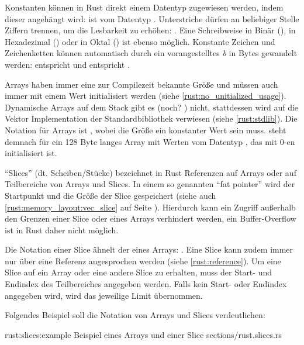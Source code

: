 Konstanten können in Rust direkt einem Datentyp zugewiesen werden, indem dieser angehängt wird:  ist vom Datentyp .
Unterstriche dürfen an beliebiger Stelle Ziffern trennen, um die Lesbarkeit zu erhöhen: .
Eine Schreibweise in Binär (), in Hexadezimal () oder in Oktal () ist ebenso möglich. 
Konstante Zeichen und Zeichenketten können automatisch durch ein vorangestelltes \textit{b} in Bytes gewandelt werden:  entspricht  und  entspricht \rustcinline{&[0x61_u8, 0x62_u8, 0x63_u8]}.

Arrays haben immer eine zur Compilezeit bekannte Größe und müssen auch immer mit einem Wert initialisiert werden (siehe \autoref{rust:no_unitialized_usage}).
Dynamische Arrays auf dem Stack gibt es (noch? \cite{rust:github:alloca}) nicht,
stattdessen wird auf die Vektor Implementation der Standardbibliothek verwiesen (siehe \autoref{rust:stdlib}).
Die Notation für Arrays ist , wobei die Größe ein konstanter Wert sein muss.
\rustcinline{[0_u8; 128]} steht demnach für ein 128 Byte langes Array mit Werten vom Datentyp , das mit 0-en initialisiert ist.

\enquote{Slices} (dt. Scheiben/Stücke) bezeichnet in Rust Referenzen auf Arrays oder auf Teilbereiche von Arrays und Slices.
In einem so genannten \enquote{fat pointer} wird der Startpunkt und die Größe der Slice gespeichert  (siehe auch \autoref{rust:memory_layout:vec_slice} auf Seite \pageref{rust:memory_layout:vec_slice}).
Hierdurch kann ein Zugriff außerhalb den Grenzen einer Slice oder eines Arrays verhindert werden, %
ein Buffer-Overflow ist in Rust daher nicht möglich.

Die Notation einer Slice ähnelt der eines Arrays: \rustcinline{&[<Datentyp>]}.
Eine Slice kann zudem immer nur über eine Referenz angesprochen werden (siehe \autoref{rust:reference}).
Um eine Slice auf ein Array oder eine andere Slice zu erhalten, muss der Start- und  Endindex des Teilbereiches angegeben werden.
Falls kein Start- oder Endindex angegeben wird, wird das jeweilige Limit übernommen.


Folgendes Beispiel soll die Notation von Arrays und Slices verdeutlichen:

\rustcinclude
	{rust:slices:example}
	{Beispiel eines Arrays und einer Slice}
	{sections/rust.slices.rs}
	
